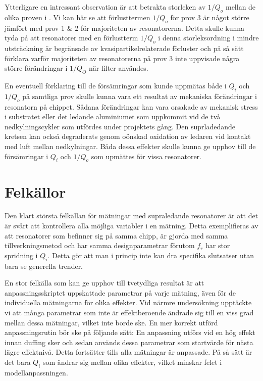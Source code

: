 \documentclass[main.tex]{subfiles}
\begin{document}
Ytterligare en intressant observation är att betrakta storleken av $1/Q_o$ mellan de olika proven i . Vi kan här se att förlusttermen $1/Q_o$ för prov 3 är något större jämfört med prov 1 \& 2 för majoriteten av resonatorerna. Detta skulle kunna tyda på att resonatorer med en förlustterm $1/Q_o$ i denna storleksordning i mindre utsträckning är begränsade av kvasipartikelrelaterade förluster och på så sätt förklara varför majoriteten av resonatorerna på prov 3 inte uppvisade några större förändringar i $1/Q_O$ när filter användes.

En eventuell förklaring till de försämringar som kunde uppmätas både i $Q_i$ och $1/Q_o$ på samtliga prov skulle kunna vara ett resultat av mekaniska förändringar i resonatorn på chippet. Sådana förändringar kan vara orsakade av mekanisk stress i substratet eller det ledande aluminiumet som uppkommit vid de två nedkylningscykler som utfördes under projektets gång. Den suprladedande kretsen kan också degraderats genom oönskad oxidation av ledaren vid kontakt med luft mellan nedkylningar. Båda dessa effekter skulle kunna ge upphov till de försämringar i $Q_i$ och $1/Q_o$ som upmättes för vissa resonatorer.






\section{Felkällor}
Den klart största felkällan för mätningar med supraledande resonatorer är att det är svårt att kontrollera alla möjliga variabler i en mätning. Detta exemplifieras av att resonatorer som befinner sig på samma chipp, är gjorda med samma tillverkningsmetod och har samma designparametrar förutom $f_r$ har stor spridning i $Q_i$. Detta gör att man i princip inte kan dra specifika slutsatser utan bara se generella trender.

En stor felkälla som kan ge upphov till tvetydliga resultat är att anpassningsskriptet uppskattade parametrar på varje mätning, även för de individuella mätningarna för olika effekter. Vid närmre undersökning upptäckte vi att många parametrar som inte är effektberoende ändrade sig till en viss grad mellan dessa mätningar, vilket inte borde ske. En mer korrekt utförd anpassningsrutin bör ske på följande sätt:
En anpassning utförs vid en hög effekt innan duffing sker och sedan används dessa parametrar som startvärde för nästa lägre effektnivå. Detta fortsätter tills alla mätningar är anpassade. På så sätt är det bara $Q_i$ som ändrar sig mellan olika effekter, vilket minskar felet i modellanpassningen.
\end{document}
